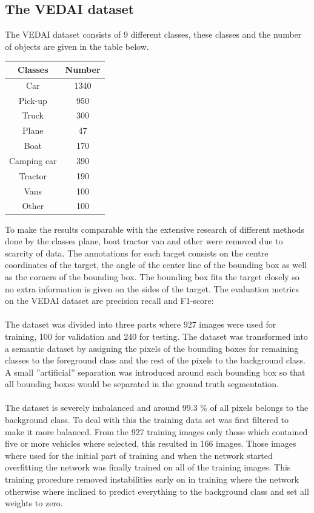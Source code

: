 \documentclass{kththesis}
\begin{document}
\subsection{The VEDAI dataset}
The VEDAI dataset \cite{razakarivony_vehicle_2015} consists of 9 different classes, these classes and the number of objects are given in the table below.\begin{center}
\begin{tabular}{|c|c|}
\hline
\textbf{Classes} & \textbf{Number}\\
\hline
Car & 1340\\
Pick-up & 950\\
Truck & 300\\
Plane & 47\\
Boat & 170\\
Camping car & 390\\
Tractor & 190\\
Vans & 100\\
Other & 100\\
\hline
\end{tabular}
\end{center}
To make the results comparable with the extensive research of different methods done by \cite{zhong_robust_2017} the classes plane, boat tractor van and other were removed due to scarcity of data.  The annotations for each target consists on the centre coordinates of the target, the angle of the center line of the bounding box as well as the corners of the bounding box. The bounding box fits the target closely so no extra information is given on the sides of the target. The evaluation metrics on the VEDAI dataset are precision recall and F1-score:\\
\\
The dataset was divided into three parts where 927 images were used for training, 100 for validation and 240 for testing. The dataset was transformed into a semantic dataset by assigning the pixels of the bounding boxes for remaining classes to the foreground class and the rest of the pixels to the background class. A small ''artificial'' separation was introduced around each bounding box so that all bounding boxes would be separated in the ground truth segmentation.\\
\\
The dataset is severely imbalanced and around 99.3 \% of all pixels belongs to the background class. To deal with this the training data set was first filtered to make it more balanced. From the 927 training images only those which contained five or more vehicles where selected, this resulted in 166 images. Those images where used for the initial part of training and when the network started overfitting the network was finally trained on all of the training images. This training procedure removed instabilities early on in training where the network otherwise where inclined to predict everything to the background class and set all weights to zero.
\end{document}

